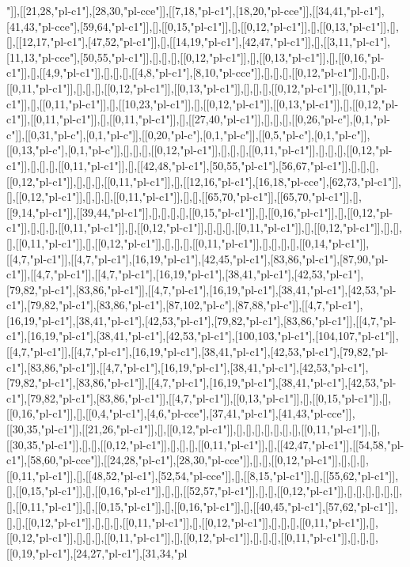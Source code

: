 "]],[[21,28,"pl-c1"],[28,30,"pl-cce"]],[[7,18,"pl-c1"],[18,20,"pl-cce"]],[[34,41,"pl-c1"],[41,43,"pl-cce"],[59,64,"pl-c1"]],[],[[0,15,"pl-c1"]],[],[[0,12,"pl-c1"]],[],[[0,13,"pl-c1"]],[],[],[[12,17,"pl-c1"],[47,52,"pl-c1"]],[],[[14,19,"pl-c1"],[42,47,"pl-c1"]],[],[[3,11,"pl-c1"],[11,13,"pl-cce"],[50,55,"pl-c1"]],[],[],[],[[0,12,"pl-c1"]],[],[[0,13,"pl-c1"]],[],[[0,16,"pl-c1"]],[],[[4,9,"pl-c1"]],[],[],[],[[4,8,"pl-c1"],[8,10,"pl-cce"]],[],[],[],[[0,12,"pl-c1"]],[],[],[],[[0,11,"pl-c1"]],[],[],[],[[0,12,"pl-c1"]],[[0,13,"pl-c1"]],[],[],[],[[0,12,"pl-c1"]],[[0,11,"pl-c1"]],[],[[0,11,"pl-c1"]],[],[[10,23,"pl-c1"]],[],[[0,12,"pl-c1"]],[[0,13,"pl-c1"]],[],[[0,12,"pl-c1"]],[[0,11,"pl-c1"]],[],[[0,11,"pl-c1"]],[],[[27,40,"pl-c1"]],[],[],[],[[0,26,"pl-c"],[0,1,"pl-c"]],[[0,31,"pl-c"],[0,1,"pl-c"]],[[0,20,"pl-c"],[0,1,"pl-c"]],[[0,5,"pl-c"],[0,1,"pl-c"]],[[0,13,"pl-c"],[0,1,"pl-c"]],[],[],[],[[0,12,"pl-c1"]],[],[],[],[[0,11,"pl-c1"]],[],[],[],[[0,12,"pl-c1"]],[],[],[],[[0,11,"pl-c1"]],[],[[42,48,"pl-c1"],[50,55,"pl-c1"],[56,67,"pl-c1"]],[],[],[],[[0,12,"pl-c1"]],[],[],[],[[0,11,"pl-c1"]],[],[[12,16,"pl-c1"],[16,18,"pl-cce"],[62,73,"pl-c1"]],[],[[0,12,"pl-c1"]],[],[],[],[[0,11,"pl-c1"]],[],[],[[65,70,"pl-c1"]],[[65,70,"pl-c1"]],[],[[9,14,"pl-c1"]],[[39,44,"pl-c1"]],[],[],[],[],[[0,15,"pl-c1"]],[],[[0,16,"pl-c1"]],[],[[0,12,"pl-c1"]],[],[],[],[[0,11,"pl-c1"]],[],[[0,12,"pl-c1"]],[],[],[],[[0,11,"pl-c1"]],[],[[0,12,"pl-c1"]],[],[],[],[[0,11,"pl-c1"]],[],[[0,12,"pl-c1"]],[],[],[],[[0,11,"pl-c1"]],[],[],[],[],[[0,14,"pl-c1"]],[[4,7,"pl-c1"]],[[4,7,"pl-c1"],[16,19,"pl-c1"],[42,45,"pl-c1"],[83,86,"pl-c1"],[87,90,"pl-c1"]],[[4,7,"pl-c1"]],[[4,7,"pl-c1"],[16,19,"pl-c1"],[38,41,"pl-c1"],[42,53,"pl-c1"],[79,82,"pl-c1"],[83,86,"pl-c1"]],[[4,7,"pl-c1"],[16,19,"pl-c1"],[38,41,"pl-c1"],[42,53,"pl-c1"],[79,82,"pl-c1"],[83,86,"pl-c1"],[87,102,"pl-c"],[87,88,"pl-c"]],[[4,7,"pl-c1"],[16,19,"pl-c1"],[38,41,"pl-c1"],[42,53,"pl-c1"],[79,82,"pl-c1"],[83,86,"pl-c1"]],[[4,7,"pl-c1"],[16,19,"pl-c1"],[38,41,"pl-c1"],[42,53,"pl-c1"],[100,103,"pl-c1"],[104,107,"pl-c1"]],[[4,7,"pl-c1"]],[[4,7,"pl-c1"],[16,19,"pl-c1"],[38,41,"pl-c1"],[42,53,"pl-c1"],[79,82,"pl-c1"],[83,86,"pl-c1"]],[[4,7,"pl-c1"],[16,19,"pl-c1"],[38,41,"pl-c1"],[42,53,"pl-c1"],[79,82,"pl-c1"],[83,86,"pl-c1"]],[[4,7,"pl-c1"],[16,19,"pl-c1"],[38,41,"pl-c1"],[42,53,"pl-c1"],[79,82,"pl-c1"],[83,86,"pl-c1"]],[[4,7,"pl-c1"]],[[0,13,"pl-c1"]],[],[[0,15,"pl-c1"]],[],[[0,16,"pl-c1"]],[],[[0,4,"pl-c1"],[4,6,"pl-cce"],[37,41,"pl-c1"],[41,43,"pl-cce"]],[[30,35,"pl-c1"]],[[21,26,"pl-c1"]],[],[[0,12,"pl-c1"]],[],[],[],[],[],[],[],[[0,11,"pl-c1"]],[],[[30,35,"pl-c1"]],[],[],[[0,12,"pl-c1"]],[],[],[],[[0,11,"pl-c1"]],[],[[42,47,"pl-c1"]],[[54,58,"pl-c1"],[58,60,"pl-cce"]],[[24,28,"pl-c1"],[28,30,"pl-cce"]],[],[],[[0,12,"pl-c1"]],[],[],[],[[0,11,"pl-c1"]],[],[[48,52,"pl-c1"],[52,54,"pl-cce"]],[],[[8,15,"pl-c1"]],[],[[55,62,"pl-c1"]],[],[[0,15,"pl-c1"]],[],[[0,16,"pl-c1"]],[],[],[[52,57,"pl-c1"]],[],[],[[0,12,"pl-c1"]],[],[],[],[],[],[],[],[[0,11,"pl-c1"]],[],[[0,15,"pl-c1"]],[],[[0,16,"pl-c1"]],[],[[40,45,"pl-c1"],[57,62,"pl-c1"]],[],[],[[0,12,"pl-c1"]],[],[],[],[[0,11,"pl-c1"]],[],[[0,12,"pl-c1"]],[],[],[],[[0,11,"pl-c1"]],[],[[0,12,"pl-c1"]],[],[],[],[[0,11,"pl-c1"]],[],[[0,12,"pl-c1"]],[],[],[],[[0,11,"pl-c1"]],[],[],[],[[0,19,"pl-c1"],[24,27,"pl-c1"],[31,34,"pl